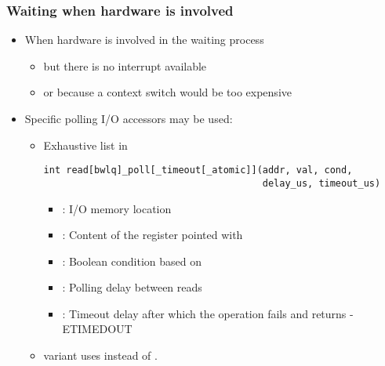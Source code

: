 \begin{frame}[fragile]
  \frametitle{Waiting when hardware is involved}
  \begin{itemize}
  \item When hardware is involved in the waiting process
    \begin{itemize}
    \item but there is no interrupt available
    \item or because a context switch would be too expensive
    \end{itemize}
  \item Specific polling I/O accessors may be used:
    \begin{itemize}
    \item Exhaustive list in 
      \begin{verbatim}
int read[bwlq]_poll[_timeout[_atomic]](addr, val, cond,
                                       delay_us, timeout_us)
      \end{verbatim}
        \begin{itemize}
        \item {}: I/O memory location
        \item {}: Content of the register pointed with
        \item {}: Boolean condition based on 
        \item {}: Polling delay between reads
        \item {}: Timeout delay after which the operation
          fails and returns -ETIMEDOUT
        \end{itemize}
        \item {} variant uses  instead of .
    \end{itemize}
  \end{itemize}
\end{frame}
